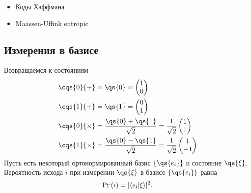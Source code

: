\begin{itemize}
    \item Коды Хаффмана
    \item Maassen-Uffink entropic
\end{itemize}

\subsection{Измерения в базисе}

Возвращаемся к состояниям 
\begin{align*}
    \cqs{0}{+} &= \qs{0} = \begin{pmatrix}
        1 \\ 0
    \end{pmatrix} \\
    \cqs{1}{+} &= \qs{1} = \begin{pmatrix}
        0 \\ 1
    \end{pmatrix} \\
    \cqs{0}{\times} &= \frac{\qs{0}+\qs{1}}{\sqrt{2}} = \frac{1}{\sqrt{2}} \begin{pmatrix}
        1  \\ 1
    \end{pmatrix} \\
    \cqs{1}{\times} &= \frac{\qs{0}-\qs{1}}{\sqrt{2}} = \frac{1}{\sqrt{2}} \begin{pmatrix}
        1 \\ -1
    \end{pmatrix} \\
\end{align*}
Пусть есть некоторый ортонормированный базис $\{\qs{e_i}\}$ и  состояние $\qs{\xi}$. Вероятность исхода $i$ при измерении $\qs{\xi}$ в базисе $\{\qs{e_i}\}$ равна
\begin{equation*}
    \textnormal{Pr}\, (i) = | \langle e_i | \xi \rangle|^2.
\end{equation*}

